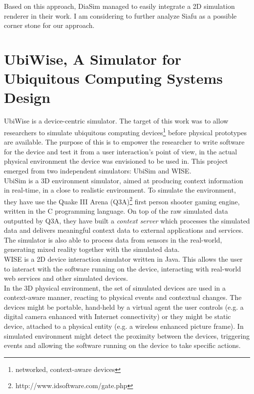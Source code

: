 Based on this approach, DiaSim managed to easily integrate a 2D simulation renderer in their work. I am considering to further analyze Siafu as a possible corner stone for our approach.

\section{UbiWise, A Simulator for Ubiquitous Computing Systems Design}\label{sec:ubiwise}

UbiWise \cite{barton2003ubiwise} is a device-centric simulator. The target of this work was to allow researchers to simulate ubiquitous computing devices\footnote{networked, context-aware devices} before physical prototypes are available. The purpose of this is to empower the researcher to write software for the device and test it from a user interaction's point of view, in the actual physical environment the device was envisioned to be used in. This project emerged from two independent simulators: UbiSim and WISE.\\

UbiSim is a 3D environment simulator, aimed at producing context information in real-time, in a close to realistic environment. To simulate the environment, they have use the Quake III Arena (Q3A)\footnote{http://www.idsoftware.com/gate.php} first person shooter gaming engine, written in the C programming language. On top of the raw simulated data outputted by Q3A, they have built a \emph{context server} which processes the simulated data and delivers meaningful context data to external applications and services. The simulator is also able to process data from sensors in the real-world, generating mixed reality together with the simulated data.\\

WISE is a 2D device interaction simulator written in Java. This allows the user to interact with the software running on the device, interacting with real-world web services and other simulated devices.\\

In the 3D physical environment, the set of simulated devices are used in a context-aware manner, reacting to physical events and contextual changes. The devices might be portable, hand-held by a virtual agent the user controls (e.g. a digital camera enhanced with Internet connectivity) or they might be static device, attached to a physical entity (e.g. a wireless enhanced picture frame). In simulated environment might detect the proximity between the devices, triggering events and allowing the software running on the device to take specific actions.\\

